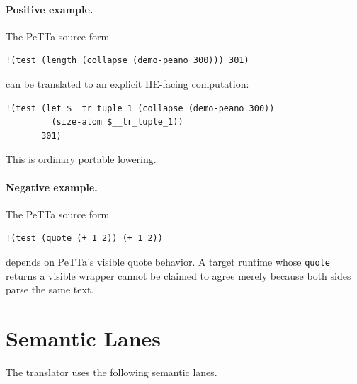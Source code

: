 \documentclass[11pt]{article}
\newcommand{\code}[1]{\texttt{#1}}
\newcommand{\HE}{\textup{HE}}
\newcommand{\PeTTa}{\textup{PeTTa}}
\begin{document}
\paragraph{Positive example.}
The \PeTTa{} source form
\begin{lstlisting}
!(test (length (collapse (demo-peano 300))) 301)
\end{lstlisting}
can be translated to an explicit \HE{}-facing computation:
\begin{lstlisting}
!(test (let $__tr_tuple_1 (collapse (demo-peano 300))
         (size-atom $__tr_tuple_1))
       301)
\end{lstlisting}
This is ordinary portable lowering.

\paragraph{Negative example.}
The \PeTTa{} source form
\begin{lstlisting}
!(test (quote (+ 1 2)) (+ 1 2))
\end{lstlisting}
depends on \PeTTa{}'s visible quote behavior.  A target runtime whose
\code{quote} returns a visible wrapper cannot be claimed to agree merely
because both sides parse the same text.

\section{Semantic Lanes}

The translator uses the following semantic lanes.
\end{document}
